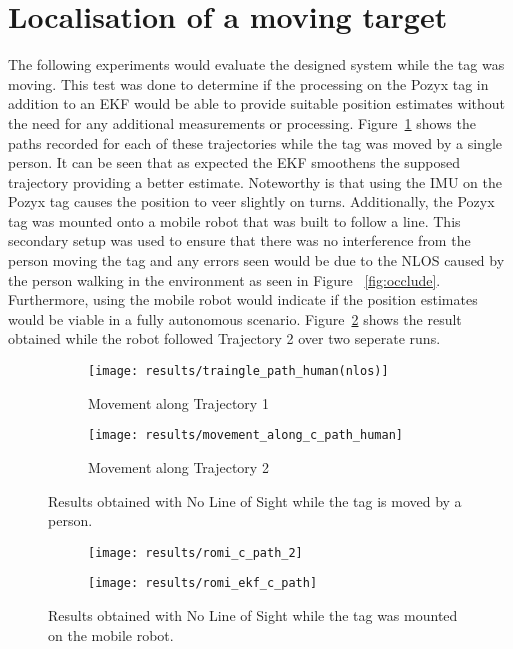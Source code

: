 \section{Localisation of a moving target}\label{sec:localisation-of-a-moving-target}
The following experiments would evaluate the designed system while the tag was moving.
This test was done to determine if the processing on the Pozyx tag in addition to an EKF would be able to provide suitable position estimates without the need for any additional measurements or processing.
Figure~\ref{fig:nlos_ppl} shows the paths recorded for each of these trajectories while the tag was moved by a single person.
It can be seen that as expected the EKF smoothens the supposed trajectory providing a better estimate.
Noteworthy is that using the IMU on the Pozyx tag causes the position to veer slightly on turns.
Additionally, the Pozyx tag was mounted onto a mobile robot that was built to follow a line.
This secondary setup was used to ensure that there was no interference from the person moving the tag and any errors seen would be due to the NLOS caused by the person walking in the environment as seen in Figure ~\ref{fig:occlude}.
Furthermore, using the mobile robot would indicate if the position estimates would be viable in a fully autonomous scenario.
Figure~\ref{fig:romi_nlos_1} shows the result obtained while the robot followed Trajectory 2 over two seperate runs.
\begin{figure}[ht!]
    \centering
    \begin{subfigure}{0.7\textwidth}
            \texttt{[image: results/traingle\_path\_human(nlos)]}
            \caption{Movement along Trajectory 1}
    \end{subfigure}
    \begin{subfigure}{0.7\textwidth}
            \texttt{[image: results/movement\_along\_c\_path\_human]}
            \caption{Movement along Trajectory 2}
    \end{subfigure}
    \caption{Results obtained with No Line of Sight while the tag is moved by a person.}
    \label{fig:nlos_ppl}
\end{figure}

\begin{figure}[ht!]
    \centering
    \begin{subfigure}{0.7\textwidth}
            \texttt{[image: results/romi\_c\_path\_2]}
    \end{subfigure}
    \begin{subfigure}{0.7\textwidth}
            \texttt{[image: results/romi\_ekf\_c\_path]}
    \end{subfigure}
    \caption{Results obtained with No Line of Sight while the tag was mounted on the mobile robot.}
    \label{fig:romi_nlos_1}
\end{figure}

